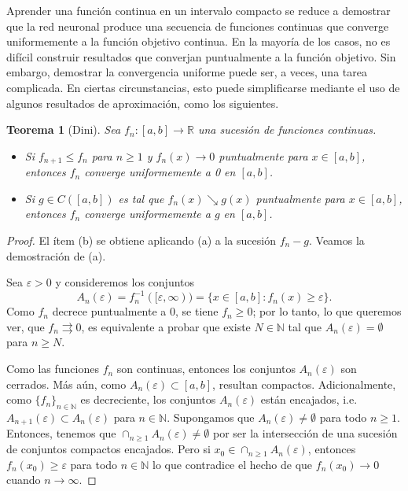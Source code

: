 \documentclass[12pt, a4paper]{amsbook}
\newcommand{\ve}{\varepsilon}
\newcommand{\R}{{\mathbb R}}
\newcommand{\N}{{\mathbb N}}
\newtheorem{teo}{Teorema}[section]
\theoremstyle{remark}
\theoremstyle{definition}
\numberwithin{section}{chapter}
\numberwithin{subsection}{section}
\numberwithin{equation}{section}
\numberwithin{figure}{chapter}
\begin{document}
Aprender una función continua en un intervalo compacto se reduce a demostrar que la red neuronal produce una secuencia de funciones continuas que converge uniformemente a la función objetivo continua. En la mayoría de los casos, no es difícil construir resultados que converjan puntualmente a la función objetivo. Sin embargo, demostrar la convergencia uniforme puede ser, a veces, una tarea complicada. En ciertas circunstancias, esto puede simplificarse mediante el uso de algunos resultados de aproximación, como los siguientes.

\begin{teo}[Dini]\label{teoDini}
Sea $f_n\colon [a, b]\to \R$ una sucesión de funciones continuas.
\begin{itemize}
\item[(a)]\label{Dini-a} Si $f_{n+1}\le f_n$ para $n\ge 1$ y $f_n(x)\to 0$ puntualmente para $x\in [a, b]$, entonces $f_n$ converge uniformemente a 0 en $[a, b]$.

\item[(b)]\label{Dini-b} Si $g\in C([a, b])$ es tal que $f_n(x)\searrow g(x)$ puntualmente para $x\in [a, b]$, entonces $f_n$ converge uniformemente a $g$ en $[a, b]$.
\end{itemize}
\end{teo}

\begin{proof}
El ítem (b) se obtiene aplicando (a) a la sucesión $f_n-g$. Veamos la demostración de (a).

Sea $\ve>0$ y consideremos los conjuntos
$$
A_n(\ve) = f_n^{-1}([\ve, \infty)) = \{x\in [a, b]\colon f_n(x)\ge \ve\}.
$$
Como $f_n$ decrece puntualmente a $0$, se tiene $f_n\ge 0$; por lo tanto, lo que queremos ver, que $f_n\rightrightarrows 0$, es equivalente a probar que existe $N\in\N$ tal que $A_n(\ve)=\emptyset$ para $n\ge N$.

Como las funciones $f_n$ son continuas, entonces los conjuntos $A_n(\ve)$ son cerrados. Más aún, como $A_n(\ve)\subset [a, b]$, resultan compactos. Adicionalmente, como $\{f_n\}_{n\in\N}$ es decreciente, los conjuntos $A_n(\ve)$ están encajados, i.e. $A_{n+1}(\ve)\subset A_n(\ve)$ para $n\in \N$. Supongamos que $A_n(\ve)\neq\emptyset$ para todo $n\ge 1$. Entonces, tenemos que $\cap_{n\ge 1} A_n(\ve)\neq\emptyset$ por ser la intersección de una sucesión de conjuntos compactos encajados. Pero si $x_0\in \cap_{n\ge 1} A_n(\ve)$, entonces $f_n(x_0)\ge \ve$ para todo $n\in\N$ lo que contradice el hecho de que $f_n(x_0)\to 0$ cuando $n\to\infty$.
\end{proof}
\end{document}
